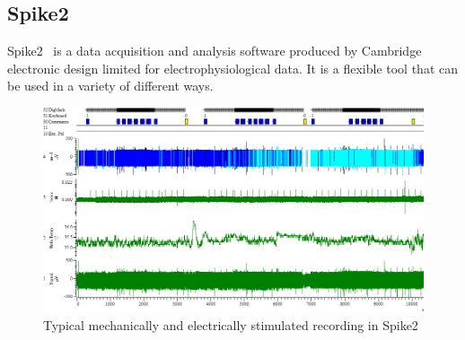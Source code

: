 \subsection{Spike2}
Spike2~\cite{spike2} is a data acquisition and analysis software produced by Cambridge electronic design limited for electrophysiological data. It is a flexible tool that can be used in a variety of different ways.

\begin{figure}
	\includegraphics[width = \textwidth]{src/pic/Spike2_screenshot}
	\caption{Typical mechanically and electrically stimulated recording in Spike2}
	\label{fig:spike2}
\end{figure}

